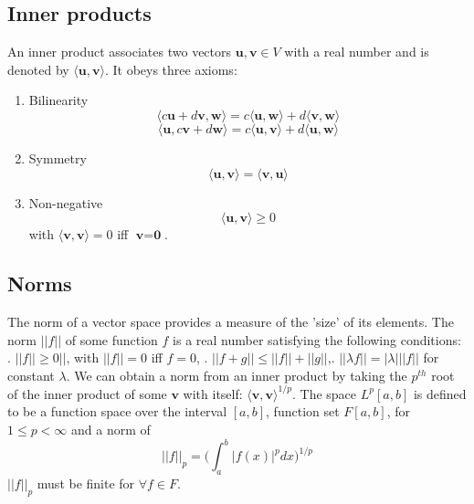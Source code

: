 \documentclass[]{article}
\begin{document}
\subsection{Inner products}
An inner product associates two vectors $\textbf{u}, \textbf{v} \in V$ with a real number and is denoted by $\langle \textbf{u}, \textbf{v} \rangle$. It obeys three axioms:
\begin{enumerate}
	\item Bilinearity \begin{equation} \langle c\textbf{u}+d\textbf{v}, \textbf{w} \rangle = c\langle \textbf{u}, \textbf{w}  \rangle + d\langle \textbf{v} , \textbf{w} \rangle \end{equation}
	\begin{equation} \langle \textbf{u},c\textbf{v}+ d\textbf{w} \rangle = c\langle \textbf{u}, \textbf{v}  \rangle + d\langle \textbf{u} , \textbf{w} \rangle \end{equation}
	\item Symmetry \begin{equation} \langle \textbf{u},\textbf{v} \rangle = \langle \textbf{v},\textbf{u} \rangle \end{equation}
	\item Non-negative \begin{equation} \langle \textbf{u},\textbf{v} \rangle \geq 0 \end{equation}
	with $\langle \textbf{v},\textbf{v} \rangle = 0$ iff $\textbf{v} = \textbf{0}$.
\end{enumerate}

\subsection{Norms}
The norm of a vector space provides a measure of the 'size' of its elements. The norm $||f||$ of some function $f$  is a real number satisfying the following conditions:
\newline
{}. $||f|| \geq 0||$, with $||f|| = 0$ iff $f=0$, . $||f+g|| \leq ||f|| + ||g||$,. $||\lambda f|| = |\lambda|||f||$ for constant $\lambda$.
\newline
\newline
We can obtain a norm from an inner product by taking the $p^{th}$ root of the inner product of some $\textbf{v}$ with itself: $\langle \textbf{v},\textbf{v} \rangle^{1/p}$.
\newline
\newline
The space $L^{p}[a,b]$ is defined to be a function space over the interval $[a,b]$, function set $F[a,b]$, for $1 \leq p < \infty$ and a norm of
\begin{equation} ||f||_{p} = \bigg( \int_{a}^{b} |f(x)|^{p}dx  \bigg)^{1/p} \end{equation}
$||f||_{p}$ must be finite for $\forall f \in F$.
\end{document}
